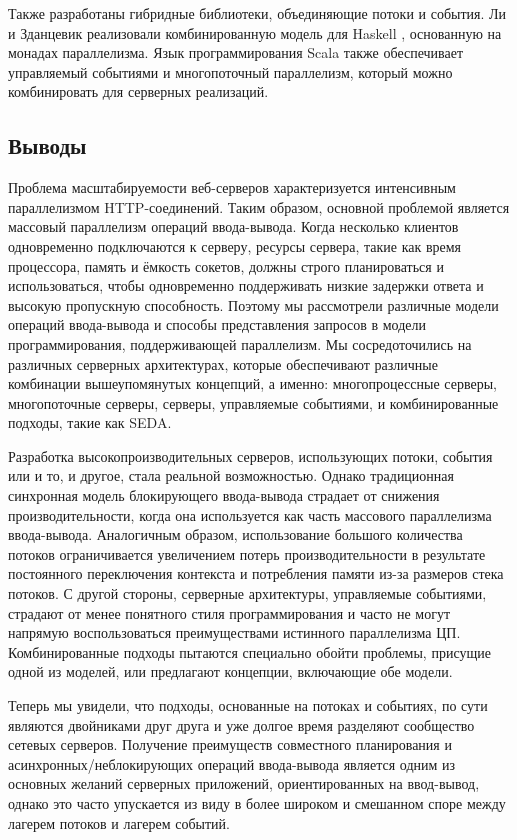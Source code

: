 Также разработаны гибридные библиотеки, объединяющие потоки и события. Ли и Зданцевик реализовали комбинированную модель для Haskell \cite{haskell-lib}, основанную на монадах параллелизма. Язык программирования Scala также обеспечивает управляемый событиями и многопоточный параллелизм, который можно комбинировать для серверных реализаций.

\subsection{Выводы}

Проблема масштабируемости веб-серверов характеризуется интенсивным параллелизмом HTTP-соединений. Таким образом, основной проблемой является массовый параллелизм операций ввода-вывода. Когда несколько клиентов одновременно подключаются к серверу, ресурсы сервера, такие как время процессора, память и ёмкость сокетов, должны строго планироваться и использоваться, чтобы одновременно поддерживать низкие задержки ответа и высокую пропускную способность. Поэтому мы рассмотрели различные модели операций ввода-вывода и способы представления запросов в модели программирования, поддерживающей параллелизм. Мы сосредоточились на различных серверных архитектурах, которые обеспечивают различные комбинации вышеупомянутых концепций, а именно: многопроцессные серверы, многопоточные серверы, серверы, управляемые событиями, и комбинированные подходы, такие как SEDA.

Разработка высокопроизводительных серверов, использующих потоки, события или и то, и другое, стала реальной возможностью. Однако традиционная синхронная модель блокирующего ввода-вывода страдает от снижения производительности, когда она используется как часть массового параллелизма ввода-вывода. Аналогичным образом, использование большого количества потоков ограничивается увеличением потерь производительности в результате постоянного переключения контекста и потребления памяти из-за размеров стека потоков. С другой стороны, серверные архитектуры, управляемые событиями, страдают от менее понятного стиля программирования и часто не могут напрямую воспользоваться преимуществами истинного параллелизма ЦП. Комбинированные подходы пытаются специально обойти проблемы, присущие одной из моделей, или предлагают концепции, включающие обе модели.

Теперь мы увидели, что подходы, основанные на потоках и событиях, по сути являются двойниками друг друга и уже долгое время разделяют сообщество сетевых серверов. Получение преимуществ совместного планирования и асинхронных/неблокирующих операций ввода-вывода является одним из основных желаний серверных приложений, ориентированных на ввод-вывод, однако это часто упускается из виду в более широком и смешанном споре между лагерем потоков и лагерем событий.

\clearpage